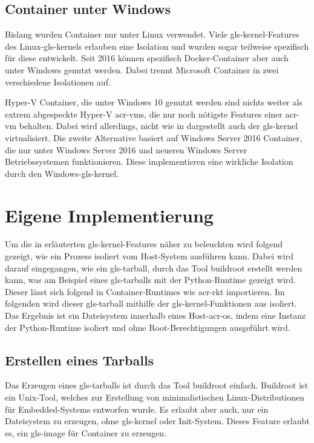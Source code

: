 \subsection{Container unter Windows}
\label{sec:windows}
Bislang wurden Container nur unter Linux verwendet. Viele \gls{gls-kernel}-Features des Linux-\glspl{gls-kernel} erlauben eine Isolation und wurden sogar teilweise spezifisch für diese entwickelt. Seit 2016 können spezifisch Docker-Container aber auch unter Windows genutzt werden. Dabei trennt Microsoft Container in zwei verschiedene Isolationen auf.

Hyper-V Container, die unter Windows 10 genutzt werden sind nichts weiter als extrem abgespeckte Hyper-V \glspl{acr-vm}, die nur noch nötigste Features einer \gls{acr-vm} behalten. Dabei wird allerdings, nicht wie in  dargestellt auch der \gls{gls-kernel} virtualisiert. Die zweite Alternative basiert auf Windows Server 2016 Container, die nur unter Windows Server 2016 und neueren Windows Server Betriebssystemen funktionieren. Diese implementieren eine wirkliche Isolation durch den Windows-\gls{gls-kernel}.

\section{Eigene Implementierung}
\label{sec:eigeneImpl}
Um die in  erläuterten \gls{gls-kernel}-Features näher zu beleuchten wird folgend gezeigt, wie ein Prozess isoliert vom Host-System ausführen kann. Dabei wird darauf eingegangen, wie ein \gls{gls-tarball}, durch das Tool buildroot erstellt werden kann, was am Beispiel eines \glspl{gls-tarball} mit der Python-Runtime gezeigt wird. Dieser lässt sich folgend in Container-Runtimes wie \gls{acr-rkt} importieren. Im folgenden wird dieser \gls{gls-tarball} mithilfe der \gls{gls-kernel}-Funktionen aus  isoliert. Das Ergebnis ist ein Dateisystem innerhalb eines Host-\gls{acr-os}, indem  eine Instanz der Python-Runtime isoliert und ohne Root-Berechtigungen ausgeführt wird.

\subsection{Erstellen eines Tarballs}
\label{sec:tarball}
Das Erzeugen eines \glspl{gls-tarball} ist durch das Tool buildroot einfach. Buildroot ist ein Unix-Tool, welches zur Erstellung von minimalistischen Linux-Distributionen für Embedded-Systems entworfen wurde. Es erlaubt aber auch, nur ein Dateisystem zu erzeugen, ohne \gls{gls-kernel} oder Init-System. Dieses Feature erlaubt es, ein \gls{gls-image} für Container zu erzeugen.

